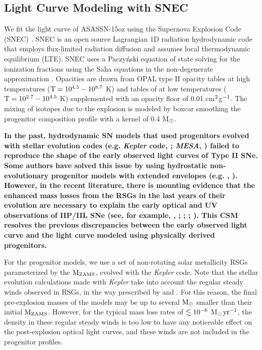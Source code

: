 \documentclass[a4paper,fleqn,usenatbib]{mnras}
\newcommand{\msunperiod}{M$\rm{_{\odot}}$}
\begin{document}
\subsection{Light Curve Modeling with SNEC}\label{sec:LCmodeling}
We fit the light curve of ASASSN-15oz using the Supernova Explosion Code (SNEC) \citep{2015morozova}.
SNEC is an open source Lagrangian 1D radiation hydrodynamic code that employs flux-limited radiation diffusion and assumes local thermodynamic equilibrium (LTE).
SNEC uses a Paczy\'nski equation of state \citep{1983paczynski} solving for the ionization fractions using the Saha equations in the non-degenerate approximation \citep{2000zaghloul}. 
Opacities are drawn from OPAL type II opacity tables \citep{1996iglesias} at high temperatures ($\rm{T=10^{4.5}-10^{8.7}}$ K) and tables of \citet{2005ferguson} at low temperatures ($\rm{T = 10^{2.7}-10^{4.5}}$ K) supplemented with an opacity floor of 0.01 cm$\rm{^2}$g$\rm{^{-1}}$. 
The mixing of isotopes due to the explosion is modeled by boxcar smoothing the progenitor composition profile with a kernel of 0.4 \msunperiod.

\textbf{In the past, hydrodynamic SN models that used progenitors evolved with stellar evolution codes (e.g. {\it Kepler} code, \citealt{1978weaver,2007woosley,2015woosley, 2014sukhbold,2016sukhbold}; {\it MESA}, \citealt{2018paxton}) failed to reproduce the shape of the early observed light curves of Type II SNe. 
Some authors have solved this issue by using hydrostatic non-evolutionary progenitor models with extended envelopes (e.g. \citealt{2008utrobin}, \citealt{2017utrobin}). 
However, in the recent literature, there is mounting evidence that the enhanced mass losses from the RSGs in the last years of their evolution are necessary to explain the early optical and UV observations of IIP/IIL SNe (see, for example, \citealt{2018morozova}, \citealt{2015gezari}; \citealt{2017yaron}; \citealt{2018bullivant}; \citealt{2018foerster}). 
This CSM resolves the previous discrepancies between the early observed light curve and the light curve modeled using physically derived progenitors.}

For the progenitor models, we use a set of non-rotating solar metallicity RSGs parameterized by the $\rm{M_{ZAMS}}$, evolved with the {\it Kepler} code.
Note that the stellar evolution calculations made with {\it Kepler} take into account the regular steady winds observed in RSGs, in the way prescribed by \citet{1990nieuwenhuijzen} and \citet{1999wellstein}.
For this reason, the final pre-explosion masses of the models may be up to several $\rm{M_{\odot}}$ smaller than their initial $\rm{M_{ZAMS}}$.
However, for the typical mass loss rates of $\rm{\lesssim10^{-6}}$ \msunperiod $\rm{yr^{-1}}$,  the density in these regular steady winds is too low to have any noticeable effect on the post-explosion optical light curves, and these winds are not included in the progenitor profiles. 
\end{document}

